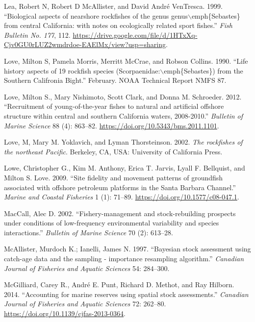 \documentclass[
  english,
  a4paper,
]{article}
\newlength{\cslhangindent}
\newlength{\cslentryspacingunit} %
\newenvironment{CSLReferences}[2] %
 {%
  \setlength{\parindent}{0pt}
  \ifodd #1
  \let\oldpar\par
  \def\par{\hangindent=\cslhangindent\oldpar}
  \fi
  \setlength{\parskip}{#2\cslentryspacingunit}
 }%
 {}
\begin{document}
\begin{CSLReferences}{1}{0}
\leavevmode{}%
Lea, Robert N, Robert D McAllister, and David André VenTresca. 1999. {``{Biological aspects of nearshore rockfishes of the genus genus\(\backslash\)emph{\{}Sebastes{\}} from central California: with notes on ecologically related sport fishes}.''} \emph{Fish Bulletin No. 177}, 112. \url{https://drive.google.com/file/d/1HTxXq-Cjv0GU0rLUZ2wmdrdoe-EAElMx/view?usp=sharing}.

\leavevmode{}%
Love, Milton S, Pamela Morris, Merritt McCrae, and Robson Collins. 1990. {``{Life history aspects of 19 rockfish species (Scorpaenidae:\(\backslash\)emph{\{}Sebastes{\}}) from the Southern Califronia Bight}.''} February. NOAA Technical Report NMFS 87.

\leavevmode{}%
Love, Milton S., Mary Nishimoto, Scott Clark, and Donna M. Schroeder. 2012. {``{Recruitment of young-of-the-year fishes to natural and artificial offshore structure within central and southern California waters, 2008-2010}.''} \emph{Bulletin of Marine Science} 88 (4): 863--82. \url{https://doi.org/10.5343/bms.2011.1101}.

\leavevmode{}%
Love, M, Mary M. Yoklavich, and Lyman Thorsteinson. 2002. \emph{{The rockfishes of the northeast Pacific}}. Berkeley, CA, USA: University of California Press.

\leavevmode{}%
Lowe, Christopher G., Kim M. Anthony, Erica T. Jarvis, Lyall F. Bellquist, and Milton S. Love. 2009. {``{Site fidelity and movement patterns of groundfish associated with offshore petroleum platforms in the Santa Barbara Channel}.''} \emph{Marine and Coastal Fisheries} 1 (1): 71--89. \url{https://doi.org/10.1577/c08-047.1}.

\leavevmode{}%
MacCall, Alec D. 2002. {``{Fishery-management and stock-rebuilding prospects under conditions of low-frequency environmental variability and species interactions}.''} \emph{Bulletin of Marine Science} 70 (2): 613--28.

\leavevmode{}%
McAllister, Murdoch K.; Ianelli, James N. 1997. {``{Bayesian stock assessment using catch-age data and the sampling - importance resampling algorithm}.''} \emph{Canadian Journal of Fisheries and Aquatic Sciences} 54: 284--300.

\leavevmode{}%
McGilliard, Carey R., André E. Punt, Richard D. Methot, and Ray Hilborn. 2014. {``{Accounting for marine reserves using spatial stock assessments}.''} \emph{Canadian Journal of Fisheries and Aquatic Sciences} 72: 262--80. \url{https://doi.org/10.1139/cjfas-2013-0364}.


\end{CSLReferences}
\end{document}
